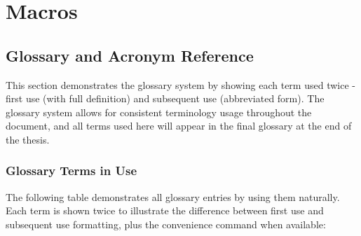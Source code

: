 \chapter{Macros}
\label{chap:Macros}
\newrefsegment
\glsresetall
\section{Glossary and Acronym Reference}
\label{sect:glossary-reference}

This section demonstrates the glossary system by showing each term used twice - first use (with full definition) and subsequent use (abbreviated form). The glossary system allows for consistent terminology usage throughout the document, and all terms used here will appear in the final glossary at the end of the thesis.

\subsection{Glossary Terms in Use}
\label{sect:glossary-terms}

The following table demonstrates all glossary entries by using them naturally. Each term is shown twice to illustrate the difference between first use and subsequent use formatting, plus the convenience command when available:

